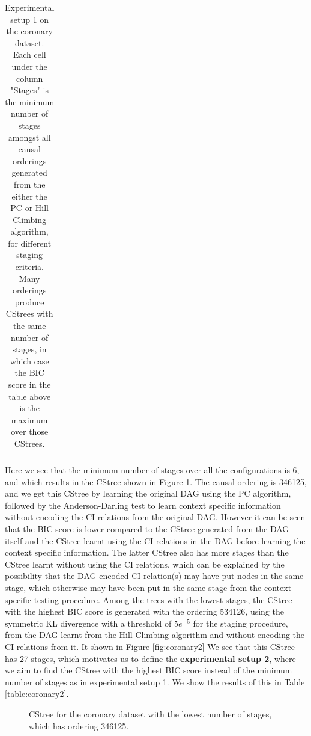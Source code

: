 \documentclass{tufte-book}
\begin{document}
\begin{Definition}
\begin{table}[]
\begin{tabular}{cccccccccccccccc}
\caption{Experimental setup 1 on the coronary dataset. Each cell under the column "Stages" is the minimum number of stages amongst all causal orderings generated from the either the PC or Hill Climbing algorithm, for different staging criteria. Many orderings produce CStrees with the same number of stages, in which case the BIC score in the table above is the maximum over those CStrees.}
\end{tabular}
\end{table}
Here we see that the minimum number of stages over all the configurations is 6, and which results in the CStree shown in Figure \ref{fig:coronary1}. The causal ordering is 346125, and we get this CStree by learning the original DAG using the PC algorithm, followed by the Anderson-Darling test to learn context specific information without encoding the CI relations from the original DAG. However it can be seen that the BIC score is lower compared to the CStree generated from the DAG itself and the CStree learnt using the CI relations in the DAG before learning the context specific information. The latter CStree also has more stages than the CStree learnt without using the CI relations, which can be explained by the possibility that the DAG encoded CI relation(s) may have put nodes in the same stage, which otherwise may have been put in the same stage from the context specific testing procedure. Among the trees with the lowest stages, the CStree with the highest BIC score is generated with the ordering 534126, using the symmetric KL divergence with a threshold of \(5e^{-5}\) for the staging procedure, from the DAG learnt from the Hill Climbing algorithm and without encoding the CI relations from it. It shown in Figure \ref{fig:coronary2} We see that this CStree has 27 stages, which motivates us to define the \textbf{experimental setup 2}, where we aim to find the CStree with the highest BIC score instead of the minimum number of stages as in experimental setup 1. We show the results of this in Table \ref{table:coronary2}.

\begin{figure}[]\label{fig:coronary1}
   \begin{floatrow}
%
\caption{CStree for the coronary dataset with the lowest number of stages, which has ordering 346125.}
        

\end{floatrow}
\end{figure}
\end{Definition}
\end{document}

